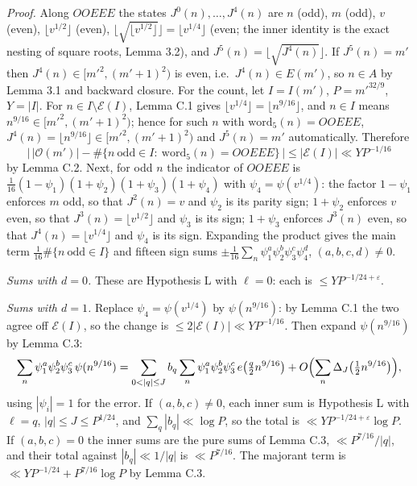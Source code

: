 \documentclass[11pt,a4paper]{article}
\begin{document}
\emph{Proof.} Along \(OOEEE\) the states \(J^0(n),\dots,J^4(n)\) are
\(n\) (odd), \(m\) (odd), \(v\) (even), \(\lfloor v^{1/2}\rfloor\)
(even),
\(\lfloor\sqrt{\lfloor v^{1/2}\rfloor}\rfloor=\lfloor v^{1/4}\rfloor\)
(even; the inner identity is the exact nesting of square roots, Lemma
3.2), and \(J^5(n)=\lfloor\sqrt{J^4(n)}\rfloor\). If \(J^5(n)=m'\) then
\(J^4(n)\in[m'^2,(m'+1)^2)\) is even, i.e.~\(J^4(n)\in E(m')\), so
\(n\in A\) by Lemma 3.1 and backward closure. For the count, let
\(I=I(m')\), \(P=m'^{32/9}\), \(Y=|I|\). For
\(n\in I\setminus\mathcal E(I)\), Lemma C.1 gives
\(\lfloor v^{1/4}\rfloor=\lfloor n^{9/16}\rfloor\), and \(n\in I\) means
\(n^{9/16}\in[m'^2,(m'+1)^2)\); hence for such \(n\) with
\(\mathrm{word}_5(n)=OOEEE\),
\(J^4(n)=\lfloor n^{9/16}\rfloor\in[m'^2,(m'+1)^2)\) and \(J^5(n)=m'\)
automatically. Therefore \[
\bigl|\,|\mathcal O(m')|-\#\{n\ \text{odd}\in I:\ \mathrm{word}_5(n)=OOEEE\}\,\bigr|\le|\mathcal E(I)|\ll YP^{-1/16}
\] by Lemma C.2. Next, for odd \(n\) the indicator of \(OOEEE\) is
\(\tfrac1{16}(1-\psi_1)(1+\psi_2)(1+\psi_3)(1+\psi_4)\) with
\(\psi_4=\psi(v^{1/4})\): the factor \(1-\psi_1\) enforces \(m\) odd, so
that \(J^2(n)=v\) and \(\psi_2\) is its parity sign; \(1+\psi_2\)
enforces \(v\) even, so that \(J^3(n)=\lfloor v^{1/2}\rfloor\) and
\(\psi_3\) is its sign; \(1+\psi_3\) enforces \(J^3(n)\) even, so that
\(J^4(n)=\lfloor v^{1/4}\rfloor\) and \(\psi_4\) is its sign. Expanding
the product gives the main term \(\tfrac1{16}\#\{n\ \text{odd}\in I\}\)
and fifteen sign sums
\(\pm\tfrac1{16}\sum_n\psi_1^a\psi_2^b\psi_3^c\psi_4^d\),
\((a,b,c,d)\ne 0\).

\emph{Sums with \(d=0\).} These are Hypothesis L with \(\ell=0\): each
is \(\le YP^{-1/24+\varepsilon}\).

\emph{Sums with \(d=1\).} Replace \(\psi_4=\psi(v^{1/4})\) by
\(\psi(n^{9/16})\): by Lemma C.1 the two agree off \(\mathcal E(I)\), so
the change is \(\le 2|\mathcal E(I)|\ll YP^{-1/16}\). Then expand
\(\psi(n^{9/16})\) by Lemma C.3: \[
\sum_n\psi_1^a\psi_2^b\psi_3^c\,\psi(n^{9/16})
=\sum_{0<|q|\le J}b_q\sum_n\psi_1^a\psi_2^b\psi_3^c\,e\bigl(\tfrac q2n^{9/16}\bigr)
+O\Bigl(\sum_n\Delta_J\bigl(\tfrac12n^{9/16}\bigr)\Bigr),
\] using \(|\psi_i|=1\) for the error. If \((a,b,c)\ne 0\), each inner
sum is Hypothesis L with \(\ell=q\), \(|q|\le J\le P^{1/24}\), and
\(\sum_q|b_q|\ll\log P\), so the total is
\(\ll YP^{-1/24+\varepsilon}\log P\). If \((a,b,c)=0\) the inner sums
are the pure sums of Lemma C.3, \(\ll P^{7/16}/|q|\), and their total
against \(|b_q|\ll 1/|q|\) is \(\ll P^{7/16}\). The majorant term is
\(\ll YP^{-1/24}+P^{7/16}\log P\) by Lemma C.3.
\end{document}
